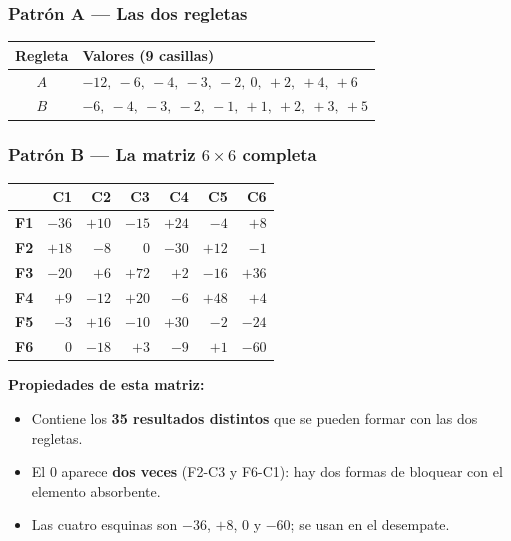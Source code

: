 \documentclass[12pt, letterpaper]{article}
\begin{document}
\subsubsection{Patrón A — Las dos regletas}

\begin{center}
\small
\begin{tabular}{@{}c l@{}}
\toprule
\textbf{Regleta} & \textbf{Valores (9 casillas)}\\
\midrule
$A$ & $-12,\ -6,\ -4,\ -3,\ -2,\ 0,\ +2,\ +4,\ +6$\\
$B$ & $-6,\ -4,\ -3,\ -2,\ -1,\ +1,\ +2,\ +3,\ +5$\\
\bottomrule
\end{tabular}
\end{center}

\subsubsection{Patrón B — La matriz $6\times 6$ completa}

\begin{center}
\small
\begin{tabular}{@{}c|r|r|r|r|r|r@{}}
\toprule
 & \textbf{C1} & \textbf{C2} & \textbf{C3} & \textbf{C4} & \textbf{C5} & \textbf{C6}\\
\midrule
\textbf{F1} & $-36$ & $+10$ & $-15$ & $+24$ & $-4$ & $+8$\\
\midrule
\textbf{F2} & $+18$ & $-8$ & $0$ & $-30$ & $+12$ & $-1$\\
\midrule
\textbf{F3} & $-20$ & $+6$ & $+72$ & $+2$ & $-16$ & $+36$\\
\midrule
\textbf{F4} & $+9$ & $-12$ & $+20$ & $-6$ & $+48$ & $+4$\\
\midrule
\textbf{F5} & $-3$ & $+16$ & $-10$ & $+30$ & $-2$ & $-24$\\
\midrule
\textbf{F6} & $0$ & $-18$ & $+3$ & $-9$ & $+1$ & $-60$\\
\bottomrule
\end{tabular}
\end{center}

\textbf{Propiedades de esta matriz:}
\begin{itemize}[leftmargin=*]
  \item Contiene los \textbf{35 resultados distintos} que se pueden formar con las dos regletas.
  \item El $0$ aparece \textbf{dos veces} (F2-C3 y F6-C1): hay dos formas de bloquear con el elemento absorbente.
  \item Las cuatro esquinas son $-36$, $+8$, $0$ y $-60$; se usan en el desempate.
\end{itemize}
\end{document}

